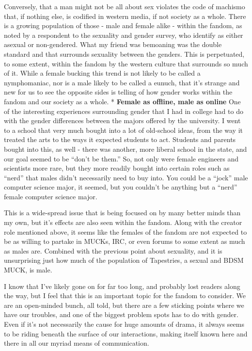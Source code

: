 Conversely, that a man might not be all about sex violates the code of
machismo that, if nothing else, is codified in western media, if not
society as a whole. There is a growing population of those - male and
female alike - within the fandom, as noted by a respondent to the
sexuality and gender survey, who identify as either asexual or
non-gendered. What my friend was bemoaning was the double standard and
that surrounds sexuality between the genders. This is perpetuated, to
some extent, within the fandom by the western culture that surrounds so
much of it. While a female bucking this trend is not likely to be called
a nymphomaniac, nor is a male likely to be called a eunuch, that it's
strange and new for us to see the opposite sides is telling of how
gender works within the fandom and our society as a whole. *
\textbf{Female as offline, male as online} One of the interesting
experiences surrounding gender that I had in college had to do with the
gender differences between the majors offered by the university. I went
to a school that very much bought into a lot of old-school ideas, from
the way it treated the arts to the ways it expected students to act.
Students and parents bought into this, as well - there was another, more
liberal school in the state, and our goal seemed to be ``don't be
them.'' So, not only were female engineers and scientists more rare, but
they more readily bought into certain roles such as ``nerd'' that males
didn't necessarily need to buy into. You could be a ``jock'' male
computer science major, it seemed, but you couldn't be anything but a
``nerd'' female computer science major.

This is a wide-spread issue that is being focused on by many better
minds than my own, but it's effects are also seen within the fandom.
Along with the creator role mentioned above, it seems like the females
of the fandom are not expected to be as willing to partake in MUCKs,
IRC, or even forums to some extent as much as males are. Combined with
the previous point about sexuality, and it is unsurprising just how much
of the population of Tapestries, a sexual and BDSM MUCK, is male.

I know that I've likely gone on for far too long, and probably lost
readers along the way, but I feel that this is an important topic for
the fandom to consider. We are an open-minded bunch, all told, but there
are a few sticking points where we have our troubles, and one of the
biggest problem spots has to do with gender. Even if it's not
necessarily the cause for huge amounts of drama, it always seems to be
riding beneath the surface of our interactions, making itself known here
and there in all our myriad means of communication.

